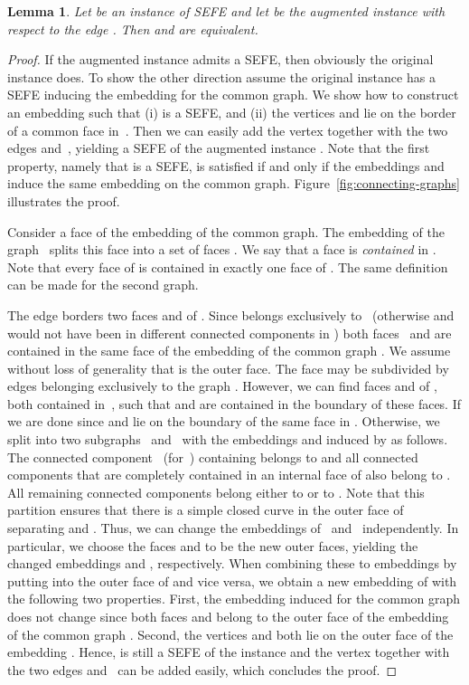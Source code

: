 \documentclass{scrartcl}
\renewcommand{\todo}[1]{}
\newcommand{\1}[1]{{\normalfont \ensuremath{#1^{\tiny\circled{1}}}}} \newcommand{\2}[1]{{\normalfont \ensuremath{#1^{\tiny\circled{2}}}}} \renewcommand{\k}[1]{{\normalfont \ensuremath{#1^{\tiny\circled{k}}}}} \newcommand{\proj}[2]{\ensuremath{\left.#1\right|_{#2}}} \newcommand{\eps}{\varepsilon}
\theoremstyle{plain} \newtheorem{theorem}{Theorem} \newcounter{lemmacounter} \setcounter{lemmacounter}{0} \newtheorem{lemma}[lemmacounter]{Lemma} \newtheorem{fact}{Fact}  \newtheorem{corollary}{Corollary} \theoremstyle{definition} \newtheorem{definition}{Definition}
\begin{document}
\begin{lemma}
\label{lem:connecting-graphs}
  Let  be an instance of {\sc SEFE} and let  be the augmented instance with respect to the edge .  Then  and  are
  equivalent.
\end{lemma}
\begin{proof}
  If the augmented instance admits a {\sc SEFE}, then obviously the
  original instance does.  To show the other direction assume the
  original instance  has a {\sc SEFE}  inducing the embedding  for the common
  graph.  We show how to construct an embedding  such
  that \todo{Pag 4, proof of Lemma 1, lines 2-3:}(i)  is a {\sc SEFE}, and (ii) the vertices 
  and  lie on the border of a common face in~.
  Then we can easily add the vertex  together with the two
  edges  and~, yielding a {\sc SEFE} of the augmented instance
  .  Note that the first property, namely that
   is a {\sc SEFE}, is satisfied if
  and only if the embeddings  and 
  induce the same embedding  on the common graph.
  Figure~\ref{fig:connecting-graphs} illustrates the proof.

  Consider a face  of the embedding  of the common
  graph.  The embedding  of the graph~ splits
  this face  into a set of faces .  We say that a face 
  is \emph{contained} in .  Note that every face of  is contained in exactly one face of .  The same
  definition can be made for the second graph.

  The edge  borders two faces  and
   of .  Since  belongs exclusively
  to~ (otherwise  and  would not have been in different
  connected components in ) both faces~ and 
  are contained in the same face  of the embedding  of
  the common graph .  We assume without loss of generality that 
  is the outer face.  The face  may be subdivided by edges
  belonging exclusively to the graph .  However, we can find
  faces  and  of , both contained
  in~, such that  and  are contained in the boundary of
  these faces.  If  we are done since  and
   lie on the boundary of the same face in .
  Otherwise, we split  into two subgraphs~ and~
  with the embeddings  and 
  induced by  as follows.  The connected
  component~ (for~) containing  belongs to
   and all connected components that are completely contained
  in an internal face of  also belong to .  All
  remaining connected components belong either to  or to
  .  Note that this partition ensures that there is a simple
  closed curve in the outer face of  separating
   and .  Thus, we can change the embeddings
  of~ and~ independently.  In
  particular, we choose the faces  and  to be the
  new outer faces, yielding the changed embeddings 
  and , respectively.  When combining these to
  embeddings by putting  into the outer face of  and
  vice versa, we obtain a new embedding  of 
  with the following two properties.  First, the embedding induced for
  the common graph does not change since both faces  and
   belong to the outer face  of the embedding 
  of the common graph .  Second, the vertices  and  both
  lie on the outer face of the embedding .  Hence,
   is still a {\sc SEFE} of the
  instance  and the vertex  together with the two
  edges  and~ can be added easily, which concludes the proof.
\end{proof}
\end{document}
